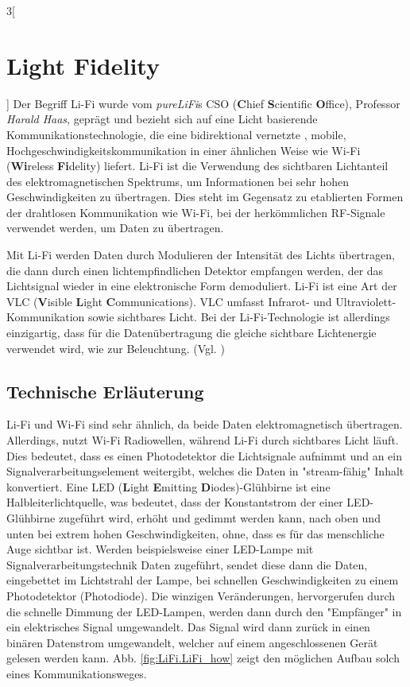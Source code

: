 \begin{multicols}{3}[\section{Light Fidelity}]
Der Begriff Li-Fi wurde vom \textit{pureLiFi}s CSO (\textbf{C}hief \textbf{S}cientific \textbf{O}ffice), Professor \textit{Harald Haas}, geprägt und bezieht sich auf eine Licht basierende Kommunikationstechnologie, die eine bidirektional vernetzte , mobile, Hochgeschwindigkeitskommunikation in einer ähnlichen Weise wie Wi-Fi (\textbf{Wi}reless \textbf{Fi}delity) liefert.
Li-Fi ist die Verwendung des sichtbaren Lichtanteil des elektromagnetischen Spektrums, um Informationen bei sehr hohen Geschwindigkeiten zu übertragen. Dies steht im Gegensatz zu etablierten Formen der drahtlosen Kommunikation wie Wi-Fi, bei der herkömmlichen RF-Signale verwendet werden, um Daten zu übertragen.

Mit Li-Fi werden Daten durch Modulieren der Intensität des Lichts übertragen, die dann durch einen lichtempfindlichen Detektor empfangen werden, der das Lichtsignal  wieder in eine elektronische Form demoduliert. 
Li-Fi ist eine Art der VLC (\textbf{V}isible \textbf{L}ight \textbf{C}ommunications). VLC umfasst Infrarot- und Ultraviolett- Kommunikation sowie sichtbares Licht. Bei der Li-Fi-Technologie ist allerdings einzigartig, dass für die Datenübertragung  die gleiche sichtbare Lichtenergie verwendet wird, wie zur Beleuchtung. (Vgl. \cite{lifi.1})

\subsection*{Technische Erläuterung}
Li-Fi und Wi-Fi sind sehr ähnlich, da beide Daten elektromagnetisch übertragen. Allerdings, nutzt Wi-Fi Radiowellen, während Li-Fi durch sichtbares Licht läuft.  Dies bedeutet, dass es einen Photodetektor die Lichtsignale aufnimmt und an ein Signalverarbeitungselement weitergibt, welches die Daten in "stream-fähig" Inhalt konvertiert.
Eine LED (\textbf{L}ight \textbf{E}mitting \textbf{D}iodes)-Glühbirne ist eine Halbleiterlichtquelle, was bedeutet, dass der Konstantstrom  der einer LED-Glühbirne zugeführt wird, erhöht und gedimmt werden kann, nach oben und unten bei extrem hohen Geschwindigkeiten, ohne, dass es für das menschliche Auge sichtbar ist.
Werden beispielsweise einer LED-Lampe mit Signalverarbeitungstechnik Daten zugeführt, sendet diese dann die Daten, eingebettet im Lichtstrahl der Lampe, bei schnellen Geschwindigkeiten zu einem Photodetektor (Photodiode).
Die winzigen Veränderungen, hervorgerufen durch die schnelle Dimmung der LED-Lampen, werden dann durch den "Empfänger" in ein elektrisches Signal umgewandelt.
Das Signal wird dann zurück in einen binären Datenstrom umgewandelt, welcher auf einem angeschlossenen Gerät gelesen werden kann.
Abb. \ref{fig:LiFi.LiFi_how} zeigt den möglichen Aufbau solch eines Kommunikationsweges.


\end{multicols}
